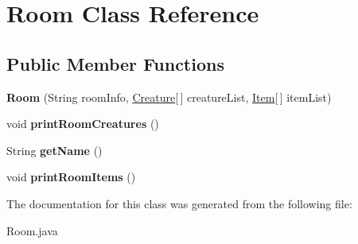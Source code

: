 \hypertarget{class_room}{}\section{Room Class Reference}
\label{class_room}
\subsection*{Public Member Functions}
\begin{DoxyCompactItemize}
\item 
\hypertarget{class_room_a719615305775cef142343f33b59635a7}{}{\bfseries Room} (String room\+Info, \hyperlink{class_creature}{Creature}\mbox{[}$\,$\mbox{]} creature\+List, \hyperlink{class_item}{Item}\mbox{[}$\,$\mbox{]} item\+List)\label{class_room_a719615305775cef142343f33b59635a7}

\item 
\hypertarget{class_room_a9a37ffe731cc4a674b678187c2fafb80}{}void {\bfseries print\+Room\+Creatures} ()\label{class_room_a9a37ffe731cc4a674b678187c2fafb80}

\item 
\hypertarget{class_room_ab638bfd4155075a97e6d3ec306b467f0}{}String {\bfseries get\+Name} ()\label{class_room_ab638bfd4155075a97e6d3ec306b467f0}

\item 
\hypertarget{class_room_a63878e6e7b9ee40f5f826bf723f42eb7}{}void {\bfseries print\+Room\+Items} ()\label{class_room_a63878e6e7b9ee40f5f826bf723f42eb7}

\end{DoxyCompactItemize}


The documentation for this class was generated from the following file\+:\begin{DoxyCompactItemize}
\item 
Room.\+java\end{DoxyCompactItemize}
